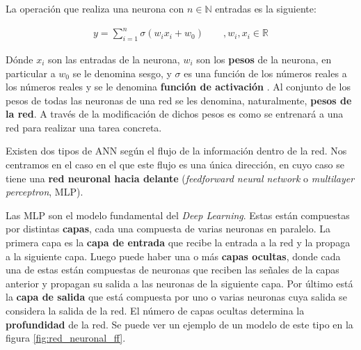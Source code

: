 La operación que realiza una neurona con $n\in\mathbb{N}$ entradas es la siguiente:

\begin{align} \label{eq:salida_neurona}
y = \sum_{i=1}^{n}\sigma({w_i x_i} + w_0) \quad \quad , w_i,x_i \in \mathbb{R}
\end{align}

Dónde $x_i$ son las entradas de la neurona, $w_i$ son los \textbf{pesos} de la neurona, en particular a $w_0$ se le denomina sesgo, y $\sigma$ es una función de los números reales a los números reales y se le denomina \textbf{función de activación} \cite{article_func_activacion}. Al conjunto de los pesos de todas las neuronas de una red se les denomina, naturalmente, \textbf{pesos de la red}. A través de la modificación de dichos pesos es como se entrenará a una red para realizar una tarea concreta.

Existen dos tipos de ANN según el flujo de la información dentro de la red. Nos centramos en el caso en el que este flujo es una única dirección, en cuyo caso se tiene una \textbf{red neuronal hacia delante} (\textit{feedforward neural network} o \textit{multilayer perceptron}, MLP).

Las MLP son el modelo fundamental del \textit{Deep Learning}. Estas están compuestas por distintas \textbf{capas}, cada una compuesta de varias neuronas en paralelo. La primera capa es la \textbf{capa de entrada} que recibe la entrada a la red y la propaga a la siguiente capa. Luego puede haber una o más \textbf{capas ocultas}, donde cada una de estas están compuestas de neuronas que reciben las señales de la capas anterior y propagan su salida a las neuronas de la siguiente capa. Por último está la \textbf{capa de salida} que está compuesta por uno o varias neuronas cuya salida se considera la salida de la red. El número de capas ocultas determina la \textbf{profundidad} de la red. Se puede ver un ejemplo de un modelo de este tipo en la figura \ref{fig:red_neuronal_ff}.


